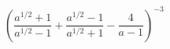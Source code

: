 \begin{ex}[type=expression]
	\begin{condition}
		\( \left( \dfrac{a^{1/2}+1}{a^{1/2}-1}+\dfrac{a^{1/2}-1}{a^{1/2}+1}-\dfrac{4}{a-1} \right)^{-3} \)
	\end{condition}
\end{ex}